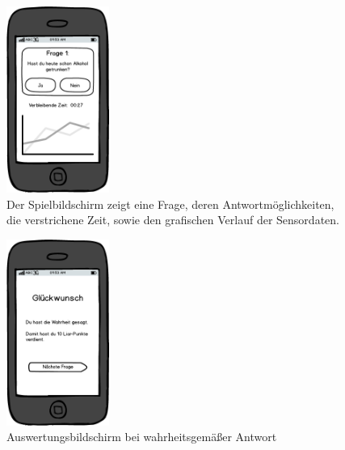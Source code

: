\documentclass[10pt, a4paper, oneside, titlepage]{scrartcl} %
\begin{document}
	\begin{figure}[ht!]
		\begin{center}
			\includegraphics[width=0.3\textwidth]{mockup_03_playgame.png}
		\end{center}
		\caption[Mockup Spielbildschirm]{Der Spielbildschirm zeigt eine Frage, deren Antwortmöglichkeiten, die verstrichene Zeit, sowie den grafischen Verlauf der Sensordaten.}
		\label{fig:mockup_03}
	\end{figure}	

	\begin{figure}[ht!]
		\begin{center}
			\includegraphics[width=0.3\textwidth]{mockup_04_score.png}
		\end{center}
		\caption[Mockup Bildschirm Fragenauswertung Wahrheit]{Auswertungsbildschirm bei wahrheitsgemäßer Antwort}
		\label{fig:mockup_04}
	\end{figure}	
\end{document}
